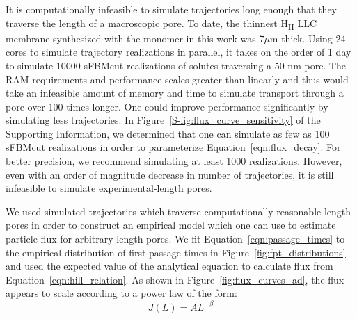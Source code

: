 \documentclass[aps,pre,preprint,groupedaddress,longbibliography]{revtex4-2}
\begin{document}
  It is computationally infeasible to simulate trajectories long enough that they
  traverse the length of a macroscopic pore. To date, the thinnest H\textsubscript{II}
  LLC membrane synthesized with the monomer in this work was 7$\mu$m thick. Using
  24 cores to simulate trajectory realizations in parallel, it takes on the order 
  of 1 day to simulate 10000 sFBMcut realizations of solutes traversing a 50 nm pore.
  The RAM requirements and performance scales greater than linearly and thus would
  take an infeasible amount of memory and time to simulate transport through a pore
  over 100 times longer. One could improve performance significantly by simulating 
  less trajectories. In Figure~\ref{S-fig:flux_curve_sensitivity} of the Supporting 
  Information, we determined that one can simulate as few as 100 sFBMcut realizations
  in order to parameterize Equation~\ref{eqn:flux_decay}. For better precision, we 
  recommend simulating at least 1000 realizations. However, even with an order of 
  magnitude decrease in number of trajectories, it is still infeasible to simulate
  experimental-length pores.
  
  We used simulated trajectories which traverse computationally-reasonable length
  pores in order to construct an empirical model which one can use to estimate 
  particle flux for arbitrary length pores. We fit Equation~\ref{eqn:passage_times}
  to the empirical distribution of first passage times in Figure~\ref{fig:fpt_distributions}
  and used the expected value of the analytical equation to calculate flux from 
  Equation~\ref{eqn:hill_relation}. As shown in Figure~\ref{fig:flux_curves_ad}, 
  the flux appears to scale according to a power law of the form:
  \begin{equation}
  J(L) = AL^{-\beta} 
  \label{eqn:flux_decay}
  \end{equation}
\end{document}
